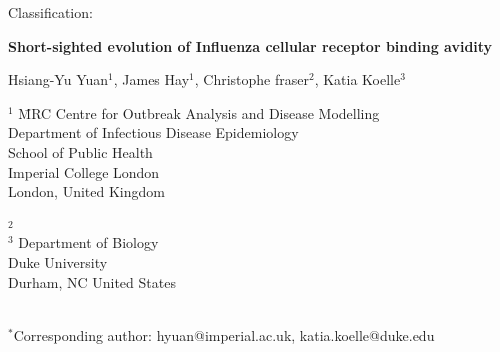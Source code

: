 \documentclass[12pt,a4paper]{article}
\begin{document}
Classification:

\large {\bf Short-sighted evolution of Influenza cellular receptor binding avidity} \normalsize

Hsiang-Yu Yuan$^{1}$, James Hay$^{1}$, Christophe fraser$^{2}$, Katia Koelle$^{3}$

\begin{tabbing}
$^1$     \= MRC Centre for Outbreak Analysis and Disease Modelling \\
        \> Department of Infectious Disease Epidemiology \\
        \> School of Public Health \\
        \> Imperial College London \\
        \> London, United Kingdom \\ \\
        
$^2$     \= \\

$^3$     \> Department of Biology \\
            \> Duke University \\
            \> Durham, NC United States \\ \\
        

\end{tabbing}
\doublespacing
$^*$Corresponding author: hyuan@imperial.ac.uk, katia.koelle@duke.edu
\clearpage




\end{document}
